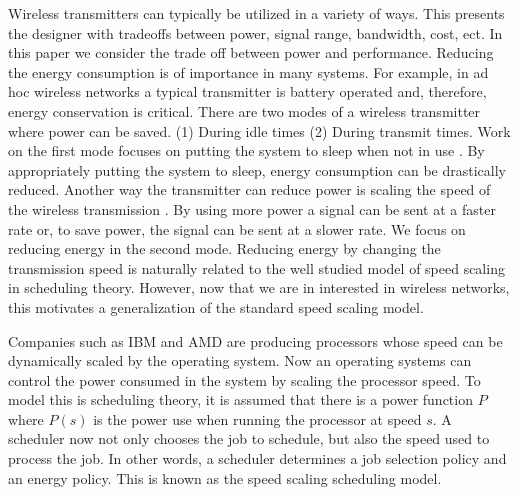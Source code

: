 \documentclass[11pt]{article}
\begin{document}
Wireless transmitters can typically be utilized in a variety of ways.  This  presents the designer with tradeoffs between power, signal range, bandwidth, cost, ect.  In this paper we consider the trade off between power and performance.  Reducing the energy consumption is of importance in many systems.  For example, in ad hoc wireless networks a typical transmitter is battery operated and, therefore, energy conservation is critical.  There are two modes of a wireless transmitter where power can be saved. (1) During idle times (2) During transmit times. Work on the first mode focuses on  putting the system to sleep when not in use \cite{Chen01,Ad00}.  By appropriately putting the system to sleep, energy consumption can be drastically reduced.   Another way the transmitter can reduce power is scaling the speed of the wireless transmission  \cite{IraniSG07}. By using more power a signal can be sent at a faster rate or, to save power, the signal can be sent at a slower rate.    We focus on reducing energy in the second mode. Reducing energy by changing the transmission speed is naturally related to the well studied model of speed scaling in scheduling theory.  However, now that we are in interested in wireless networks, this motivates a generalization of the standard speed scaling model.
 
Companies such as IBM and AMD are producing processors whose speed can be dynamically scaled by the operating system.  Now an operating systems can control the power consumed in the system by scaling the processor speed.  To model this is scheduling theory, it is assumed that there is a power function $P$ where $P(s)$ is the power use when running the processor at speed $s$.  A scheduler now not only chooses the job to schedule, but also the speed used to process the job.  In other words, a scheduler determines a job selection policy and an energy policy.  This is known as the speed scaling scheduling model.  
\end{document}
